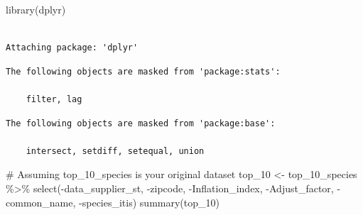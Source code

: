 \documentclass[
  letterpaper,
  DIV=11,
  numbers=noendperiod]{scrartcl}
\newenvironment{Shaded}{\begin{snugshade}}{\end{snugshade}}
\newcommand{\CommentTok}[1]{\textcolor[rgb]{0.37,0.37,0.37}{#1}}
\newcommand{\FunctionTok}[1]{\textcolor[rgb]{0.28,0.35,0.67}{#1}}
\newcommand{\NormalTok}[1]{\textcolor[rgb]{0.00,0.23,0.31}{#1}}
\newcommand{\OtherTok}[1]{\textcolor[rgb]{0.00,0.23,0.31}{#1}}
\newcommand{\SpecialCharTok}[1]{\textcolor[rgb]{0.37,0.37,0.37}{#1}}
\begin{document}
\begin{Shaded}
\end{Shaded}

\begin{Shaded}
\begin{Highlighting}[]
\FunctionTok{library}\NormalTok{(dplyr)}
\end{Highlighting}
\end{Shaded}

\begin{verbatim}

Attaching package: 'dplyr'
\end{verbatim}

\begin{verbatim}
The following objects are masked from 'package:stats':

    filter, lag
\end{verbatim}

\begin{verbatim}
The following objects are masked from 'package:base':

    intersect, setdiff, setequal, union
\end{verbatim}

\begin{Shaded}
\begin{Highlighting}[]
\CommentTok{\# Assuming top\_10\_species is your original dataset}
\NormalTok{top\_10 }\OtherTok{\textless{}{-}}\NormalTok{ top\_10\_species }\SpecialCharTok{\%\textgreater{}\%}
  \FunctionTok{select}\NormalTok{(}\SpecialCharTok{{-}}\NormalTok{data\_supplier\_st, }\SpecialCharTok{{-}}\NormalTok{zipcode, }\SpecialCharTok{{-}}\NormalTok{Inflation\_index, }\SpecialCharTok{{-}}\NormalTok{Adjust\_factor, }\SpecialCharTok{{-}}\NormalTok{common\_name, }\SpecialCharTok{{-}}\NormalTok{species\_itis)}
\FunctionTok{summary}\NormalTok{(top\_10)}
\end{Highlighting}
\end{Shaded}
\end{document}
